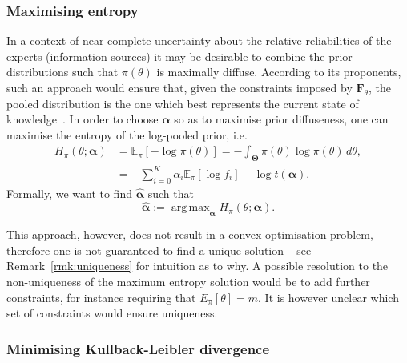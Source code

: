 \documentclass[12pt]{article}
\DeclareMathOperator*{\argmax}{arg\,max}
\begin{document}
\subsubsection{Maximising entropy}
\label{sec:maxent}

In a context of near complete uncertainty about the relative reliabilities of the experts (information sources) it may be desirable to combine the prior distributions such that $\pi(\theta)$ is maximally diffuse. %
According to its proponents, such an approach would ensure that, given the constraints imposed by $\mathbf{F}_{\theta}$, the pooled distribution is the one which best represents the current state of knowledge~\parencite{Jaynes1957,Savchuk1994}.
In order to choose $\boldsymbol\alpha$ so as to maximise prior 
diffuseness, one can maximise the entropy of the log-pooled prior, i.e.
\begin{align}
\nonumber
H_{\pi}(\theta; \boldsymbol\alpha) &= \mathbb{E}_{\pi}\left[-\log \pi(\theta) \right] =-\int_{\boldsymbol\Theta}\pi(\theta)\log\pi(\theta)\, d\theta,\\
\label{eq:entropypiB}
&= -\sum_{i=0}^{K} \alpha_i \mathbb{E}_{\pi}[\log f_i] - \log t(\boldsymbol\alpha).
\end{align}
Formally, we want to find $\hat{\boldsymbol\alpha}$ such that
\begin{equation}
\label{eq:argmaxEnt}
 \hat{\boldsymbol\alpha}:= \argmax_{\boldsymbol\alpha} H_{\pi}(\theta; \boldsymbol\alpha).
\end{equation}

This approach, however, does not result in a convex optimisation problem, therefore one is not guaranteed to find a unique solution -- see Remark~\ref{rmk:uniqueness} for intuition as to why.
A possible resolution to the non-uniqueness of the maximum entropy solution would be to add further constraints, for instance requiring that $E_{\pi}[\theta] = m$.
It is however unclear which set of constraints would ensure uniqueness.

\subsubsection{Minimising Kullback-Leibler divergence}
\label{sec:minKL}
\end{document}
